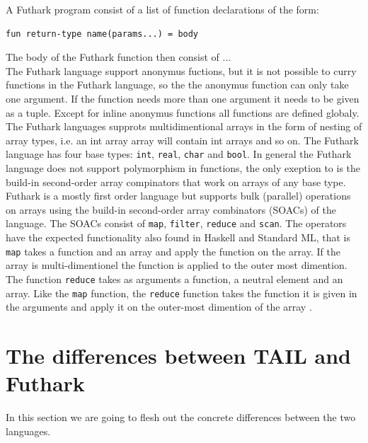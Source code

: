 \documentclass[11pt]{article}
\begin{document}
A Futhark program consist of a list of function declarations of the form:
\begin{lstlisting}[numbers=none,frame=none]
fun return-type name(params...) = body
\end{lstlisting}

The body of the Futhark function then consist of ...\\

The Futhark language support anonymus fuctions, but it is not possible to curry functions in the Futhark language, so the the anonymus function can only take one argument. If the function needs more than one argument it needs to be given as a tuple. Except for inline anonymus functions all functions are defined globaly. \\

The Futhark languages supprots multidimentional arrays in the form of nesting of array types, i.e. an int array array will contain int arrays and so on. The Futhark language has four base types: {\tt int}, {\tt real}, {\tt char} and {\tt bool}. In general the Futhark language does not support polymorphism in functions, the only exeption to is the build-in second-order array compinators that work on arrays of any base type. \\

Futhark is a mostly first order language but supports bulk (parallel) operations on arrays
using the build-in second-order array combinators (SOACs) of the language. 
The SOACs consist of {\tt map}, {\tt filter}, {\tt reduce} and {\tt scan}.
The operators have the expected functionality also found in Haskell and Standard ML, that is {\tt map} takes a function and an array and apply the function on the array. If the array is multi-dimentionel the function is applied to the outer most dimention. The function {\tt reduce} takes as arguments a function, a neutral element and an array. Like the {\tt map} function, the {\tt reduce} function takes the function it is given in the arguments and apply it on the outer-most dimention of the array \cite{TroelsHenriksen}. \\ 



\section{The differences between TAIL and Futhark}
In this section we are going to flesh out the concrete differences between the two languages. 
\end{document}
